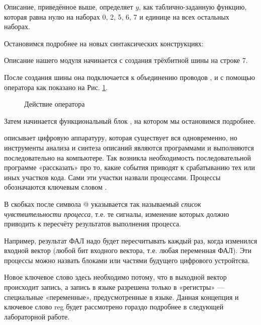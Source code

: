 

\par{Описание, приведённое выше, определяет $y$, как таблично-заданную функцию, которая равна нулю на наборах 0, 2, 5, 6, 7 и единице на всех остальных наборах.}

\par{Остановимся подробнее на новых синтаксических конструкциях:}
\par{Описание нашего модуля начинается с создания трёхбитной шины  на строке 7.}
\par{После создания шины  она подключается к объединению проводов ,  и  с помощью оператора  как показано на Рис. \ref{fig:assign}.}

\begin{figure}[H]
  \centering
  \def\svgwidth{\columnwidth}
  
  \caption{Действие оператора }
  \label{fig:assign}
\end{figure}

\par{Затем начинается функциональный блок , на котором мы остановимся подробнее.}
\par{ описывает цифровую аппаратуру, которая существует вся одновременно, но инструменты анализа и синтеза описаний являются программами и выполняются последовательно на компьютере. Так возникла необходимость последовательной программе «рассказать» про то, какие события приводят к срабатыванию тех или иных участков кода. Сами эти участки назвали процессами. Процессы обозначаются ключевым словом .}

\par{В скобках после символа @ указывается так называемый \emph{список чувствительности процесса}, т.е. те сигналы, изменение которых должно приводить к пересчёту результатов выполнения процесса.}


\par{Например, результат ФАЛ надо будет пересчитывать каждый раз, когда изменился входной вектор (любой бит входного вектора, т.е. любая переменная ФАЛ). Эти процессы можно назвать блоками или частями будущего цифрового устройтсва.}


\par{Новое ключевое слово  здесь необходимо потому, что в выходной вектор происходит запись, а запись в языке  разрешена только в «регистры» — специальные «переменные», предусмотренные в языке. Данная концепция и ключевое слово reg будет рассмотрено гораздо подробнее в следующей лабораторной работе.}

